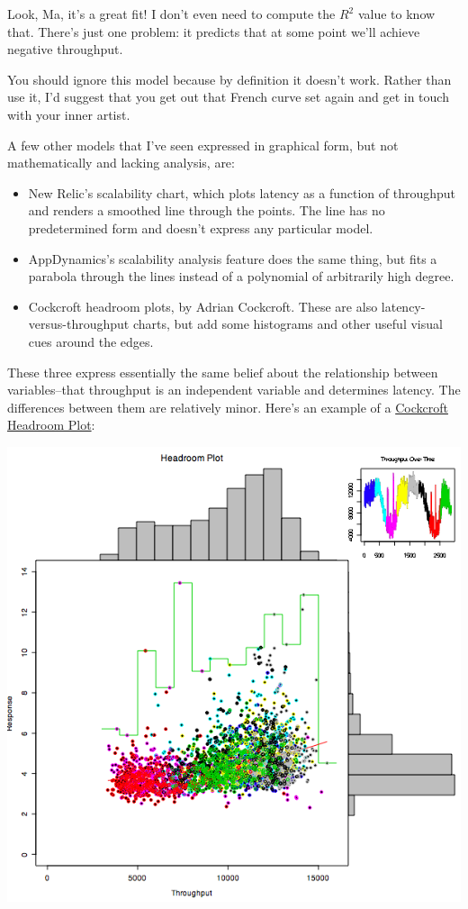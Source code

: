 \documentclass{vivid_layout}
\begin{document}
Look, Ma, it's a great fit! I don't even need to compute the $R^2$ value to know
that. There's just one problem: it predicts that at some point we'll achieve
negative throughput.

You should ignore this model because by definition it doesn't work. Rather than
use it, I'd suggest that you get out that French curve set again and get in
touch with your inner artist.

A few other models that I've seen expressed in graphical form, but not
mathematically and lacking analysis, are:

\begin{itemize}
\item New Relic's scalability chart, which plots latency as a function of
throughput and renders a smoothed line through the points. The line has no
predetermined form and doesn't express any particular model.
\item AppDynamics's scalability analysis feature does the same thing, but fits a
parabola through the lines instead of a polynomial of arbitrarily high degree.
\item Cockcroft headroom plots, by Adrian Cockcroft. These are also
latency-versus-throughput charts, but add some histograms and other useful
visual cues around the edges.
\end{itemize}

These three express essentially the same belief about the relationship between
variables--that throughput is an independent variable and determines latency.
The differences between them are relatively minor. Here's an example of a
\href{http://perfcap.blogspot.nl/2008/07/enhanced-headroom-plot-in-r.html}{Cockcroft
Headroom Plot}:
\begin{center}
\includegraphics[width=.75\linewidth]{scalability/chpblog3}
\end{center}
\end{document}
